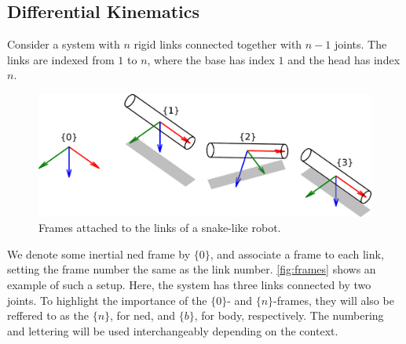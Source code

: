 \subsection{Differential Kinematics}
\label{sec:diff_kin}


Consider a system with $n$ rigid links connected together with $n-1$ joints. The
links are indexed from $1$ to $n$, where the base
has index $1$ and the head has index $n$.
\begin{figure}[h!]
    \centering
    \includegraphics[width=\textwidth]{assets/frames_thin.pdf}
    \caption{Frames attached to the links of a snake-like robot.}
    \label{fig:frames}
\end{figure}
We denote some inertial \gls{ned} frame by $\{0\}$, and associate a frame to each link,
setting the frame number the same as the link number.
\autoref{fig:frames} shows an example of such a setup. Here, the system has
three links connected by two joints. To highlight the importance of the $\{0\}$-
and $\{n\}$-frames, they will also be reffered to as the $\{n\}$, for \gls{ned}, and
$\{b\}$, for body, respectively. The numbering and lettering will be used interchangeably
depending on the context.

